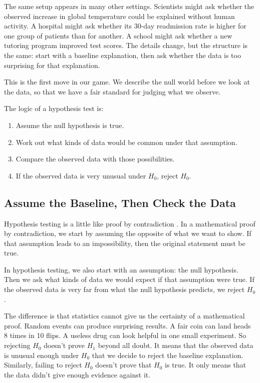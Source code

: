 The same setup appears in many other settings. Scientists might ask
whether the observed increase in global temperature could be explained
without human activity. A hospital might ask whether its 30-day
readmission rate is higher for one group of patients than for another.
A school might ask whether a new tutoring program improved test scores.
The details change, but the structure is the same: start with a
baseline explanation, then ask whether the data is too surprising for
that explanation.

This is the first move in our game. We describe the null world before
we look at the data, so that we have a fair standard for judging what
we observe.

The logic of a hypothesis test is:
\begin{enumerate}
\item Assume the null hypothesis is true.
\item Work out what kinds of data would be common under that assumption.
\item Compare the observed data with those possibilities.
\item If the observed data is very unusual under $H_0$, reject $H_0$.
\end{enumerate}

\subsection{Assume the Baseline, Then Check the Data}

Hypothesis testing is a little like proof by contradiction
\citep{reeves1980hypothesis}. In a mathematical proof by
contradiction, we start by assuming the opposite of what we want to
show. If that assumption leads to an impossibility, then the original
statement must be true.

In hypothesis testing, we also start with an assumption: the null
hypothesis. Then we ask what kinds of data we would expect if that
assumption were true. If the observed data is very far from what the
null hypothesis predicts, we reject $H_0$.

The difference is that statistics cannot give us the certainty of a
mathematical proof. Random events can produce surprising results. A
fair coin can land heads 8 times in 10 flips. A useless drug can look
helpful in one small experiment. So rejecting $H_0$ doesn't prove
$H_1$ beyond all doubt. It means that the observed data is unusual
enough under $H_0$ that we decide to reject the baseline explanation.
Similarly, failing to reject $H_0$ doesn't prove that $H_0$ is true.
It only means that the data didn't give enough evidence against it.

